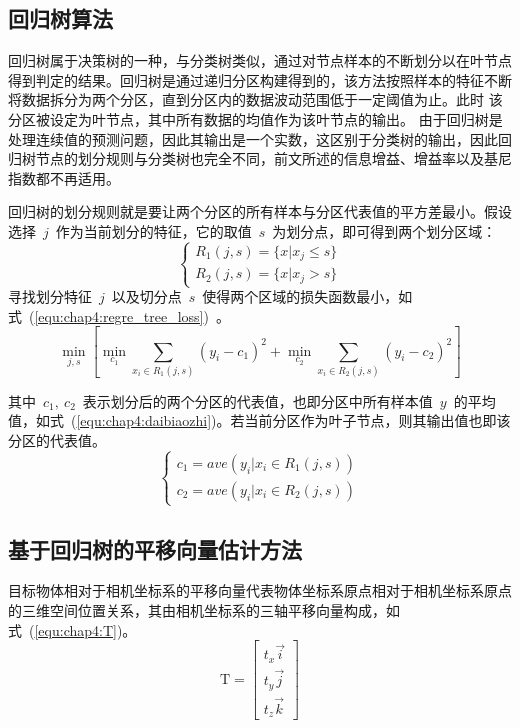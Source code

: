 \subsection{回归树算法}
\label{sec:regression_trees}
回归树属于决策树的一种，与分类树类似，通过对节点样本的不断划分以在叶节点得到判定的结果。回归树是通过递归分区构建得到的，该方法按照样本的特征不断将数据拆分为两个分区，直到分区内的数据波动范围低于一定阈值为止。此时
该分区被设定为叶节点，其中所有数据的均值作为该叶节点的输出。
由于回归树是处理连续值的预测问题，因此其输出是一个实数，这区别于分类树的输出，因此回归树节点的划分规则与分类树也完全不同，前文所述的信息增益、增益率以及基尼指数都不再适用。

回归树的划分规则就是要让两个分区的所有样本与分区代表值的平方差最小。假设选择~$j$~作为当前划分的特征，它的取值~$s$~为划分点，即可得到两个划分区域：
\begin{equation}
  \label{equ:chap4:huafenquyu}
  \left\{
    \begin{aligned}{}
      R_1(j,s) = \{x|x_j\leq s\} \\
      R_2(j,s) = \{x|x_j > s\}
    \end{aligned}
    \right.
\end{equation}
寻找划分特征~$j$~以及切分点~$s$~使得两个区域的损失函数最小，如式~(\ref{equ:chap4:regre_tree_loss})~。
\begin{equation}
  \label{equ:chap4:regre_tree_loss}
  \min_{j,s}\left[ \min_{c_1}\sum _{x_i \in R_1(j,s)} (y_i - c_1)^2 + \min_{c_2}\sum _{x_i \in R_2(j,s)} (y_i - c_2)^2\right]
\end{equation}

其中~$c_1,~c_2$~表示划分后的两个分区的代表值，也即分区中所有样本值~$y$~的平均值，如式~(\ref{equ:chap4:daibiaozhi})。若当前分区作为叶子节点，则其输出值也即该分区的代表值。
\begin{equation}
  \label{equ:chap4:daibiaozhi}
  \left\{
    \begin{aligned}{}
      c_1 = ave(y_i | x_i \in R_1(j,s)) \\
      c_2 = ave(y_i | x_i \in R_2(j,s))
    \end{aligned}
    \right.
\end{equation}

\subsection{基于回归树的平移向量估计方法}
\label{sec:T_regression}
目标物体相对于相机坐标系的平移向量代表物体坐标系原点相对于相机坐标系原点的三维空间位置关系，其由相机坐标系的三轴平移向量构成，如式~(\ref{equ:chap4:T})。
\begin{equation}
  \label{equ:chap4:T}
  \textrm{T} = \left[\begin{matrix} t_x\vec{i} \\  t_y\vec{j} \\ t_z\vec{k} \end{matrix} \right]
\end{equation}

